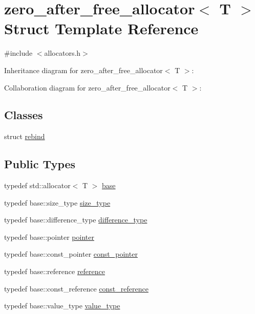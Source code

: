 \hypertarget{structzero__after__free__allocator}{}\section{zero\+\_\+after\+\_\+free\+\_\+allocator$<$ T $>$ Struct Template Reference}
\label{structzero__after__free__allocator}


{\ttfamily \#include $<$allocators.\+h$>$}



Inheritance diagram for zero\+\_\+after\+\_\+free\+\_\+allocator$<$ T $>$\+:


Collaboration diagram for zero\+\_\+after\+\_\+free\+\_\+allocator$<$ T $>$\+:
\subsection*{Classes}
\begin{DoxyCompactItemize}
\item 
struct \hyperlink{structzero__after__free__allocator_1_1rebind}{rebind}
\end{DoxyCompactItemize}
\subsection*{Public Types}
\begin{DoxyCompactItemize}
\item 
typedef std\+::allocator$<$ T $>$ \hyperlink{structzero__after__free__allocator_aab907d58a45f5bf4baeaefb373f00987}{base}
\item 
typedef base\+::size\+\_\+type \hyperlink{structzero__after__free__allocator_a85f5f3250c0519ea82ff33d980e73994}{size\+\_\+type}
\item 
typedef base\+::difference\+\_\+type \hyperlink{structzero__after__free__allocator_ab45fc8fc90d403b3b44715616e167658}{difference\+\_\+type}
\item 
typedef base\+::pointer \hyperlink{structzero__after__free__allocator_a5cc395dbe16fe421abb6cdbcb96e06bd}{pointer}
\item 
typedef base\+::const\+\_\+pointer \hyperlink{structzero__after__free__allocator_a197fbd41cb35428c2ed27c23b742ec9b}{const\+\_\+pointer}
\item 
typedef base\+::reference \hyperlink{structzero__after__free__allocator_a27e208c4c218d79cf0df9b524c674ddb}{reference}
\item 
typedef base\+::const\+\_\+reference \hyperlink{structzero__after__free__allocator_ab9e83de52f17c19f263bef6ba258fbed}{const\+\_\+reference}
\item 
typedef base\+::value\+\_\+type \hyperlink{structzero__after__free__allocator_aebbf8f000c73198eec060af6734e1f91}{value\+\_\+type}
\end{DoxyCompactItemize}
